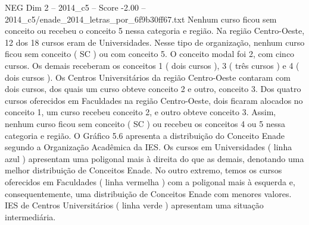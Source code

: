 \begin{textsample}{NEG Dim 2 – 2014\_c5 – Score -2.00 – 2014\_c5/enade\_2014\_letras\_por\_6f9b30ff67.txt}
Nenhum curso ficou sem conceito ou recebeu o conceito 5 nessa categoria e região.
Na região Centro-Oeste, 12 dos 18 cursos eram de Universidades.
Nesse tipo de organização, nenhum curso ficou sem conceito ( SC ) ou com conceito 5.
O conceito modal foi 2, com cinco cursos.
Os demais receberam os conceitos 1 ( dois cursos ), 3 ( três cursos ) e 4 ( dois cursos ).
Os Centros Universitários da região Centro-Oeste contaram com dois cursos, dos quais um curso obteve conceito 2 e outro, conceito 3.
Dos quatro cursos oferecidos em Faculdades na região Centro-Oeste, dois ficaram alocados no conceito 1, um curso recebeu conceito 2, e outro obteve conceito 3.
Assim, nenhum curso ficou sem conceito ( SC ) ou recebeu os conceitos 4 ou 5 nessa categoria e região.
O Gráfico 5.6 apresenta a distribuição do Conceito Enade segundo a Organização Acadêmica da IES.
Os cursos em Universidades ( linha azul ) apresentam uma poligonal mais à direita do que as demais, denotando uma melhor distribuição de Conceitos Enade.
No outro extremo, temos os cursos oferecidos em Faculdades ( linha vermelha ) com a poligonal mais à esquerda e, consequentemente, uma distribuição de Conceitos Enade com menores valores.
IES de Centros Universitários ( linha verde ) apresentam uma situação intermediária.

\end{textsample}
